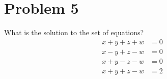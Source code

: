 \section*{Problem 5}

What is the solution to the set of equations?
\begin{align*}
    x + y + z + w & = 0 \\
    x - y + z - w & = 0 \\
    x + y - z - w & = 0 \\
    x + y + z - w & = 2
\end{align*}
